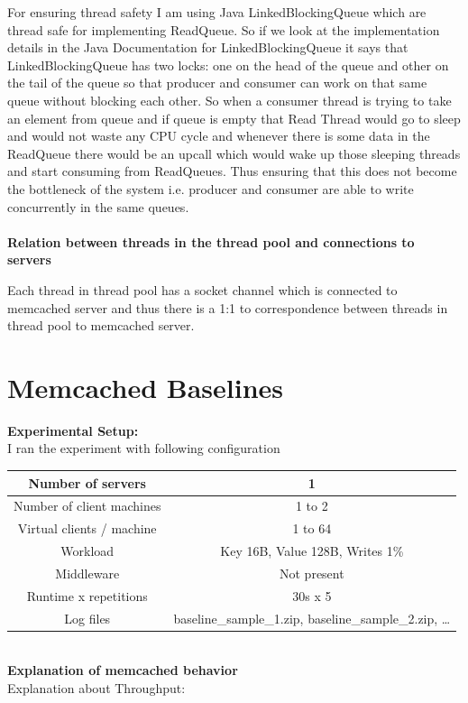 \documentclass[11pt]{article}
\begin{document}
For ensuring thread safety I am using Java LinkedBlockingQueue which are thread safe for implementing ReadQueue. So if we look at the implementation details in the Java Documentation for LinkedBlockingQueue it says that LinkedBlockingQueue has two locks: one on the head of the queue and other on the tail of the queue so that producer and consumer can work on that same queue without blocking each other. So when a consumer thread is trying to take an element from queue and if queue is empty that Read Thread would go to sleep and would not waste any CPU cycle and whenever there is some data in the ReadQueue there would be an upcall which would wake up those sleeping threads and start consuming from ReadQueues. Thus ensuring that this does not become the bottleneck of the system i.e. producer and consumer are able to write concurrently in the same queues.
\\ \\
\textbf{Relation between threads in the thread pool and connections to servers}

Each thread in thread pool has a socket channel which is connected to memcached server and thus there is a 1:1 to correspondence between threads in thread pool to memcached server.
\section{Memcached Baselines}\label{sec:baseline}

\textbf{Experimental Setup:}
\\
I ran the experiment with following configuration
\begin{center}
\small{
\smallskip
\begin{tabular}{|c|c|}
\hline Number of servers & 1 \\ 
\hline Number of client machines & 1 to 2 \\ 
\hline Virtual clients / machine & 1 to 64 \\ 
\hline Workload & Key 16B, Value 128B, Writes 1\% \footnotemark \\
\hline Middleware & Not present \\ 
\hline Runtime x repetitions & 30s x 5 \\ 
\hline Log files & baseline\_sample\_1.zip, baseline\_sample\_2.zip, \ldots \\
\hline 
\end{tabular} }
\end{center}

\textbf{\\Explanation of memcached behavior}
\\
Explanation about Throughput:
\end{document}

